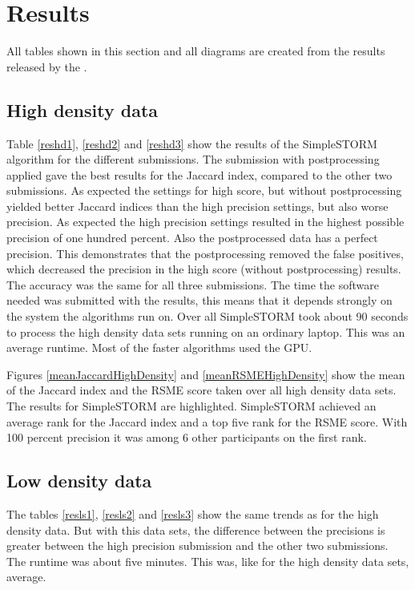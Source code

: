 \section{Results}
All tables shown in this section and all diagrams are created from the results released by the \cite{challenge}.
\subsection{High density data}
Table \ref{reshd1}, \ref{reshd2} and \ref{reshd3} show the results of the SimpleSTORM algorithm for the different submissions. The submission with postprocessing applied gave the best results for the Jaccard index, compared to the other two submissions. As expected the settings for high score, but without postprocessing yielded better Jaccard indices than the high precision settings, but also worse precision. As expected the high precision settings resulted in the highest possible precision of one hundred percent. Also the postprocessed data has a perfect precision. This demonstrates that the postprocessing removed the false positives, which decreased the precision in the high score (without postprocessing) results. The accuracy was the same for all three submissions.\newline
The time the software needed was submitted with the results, this means that it depends strongly on the system the algorithms run on. Over all SimpleSTORM took about 90 seconds to process the high density data sets running on an ordinary laptop. This was an average runtime. Most of the faster algorithms used the GPU.

Figures \ref{meanJaccardHighDensity} and \ref{meanRSMEHighDensity} show the mean of the Jaccard index and the RSME score taken over all high density data sets. The results for SimpleSTORM are highlighted. SimpleSTORM achieved an average rank for the Jaccard index and a top five rank for the RSME score. With 100 percent precision it was among 6 other participants on the first rank.




\subsection{Low density data}
The tables \ref{resls1}, \ref{resls2} and \ref{resls3} show the same trends as for the high density data. But with this data sets, the difference between the precisions is greater between the high precision submission and the other two submissions. The runtime was about five minutes. This was, like for the high density data sets, average.



